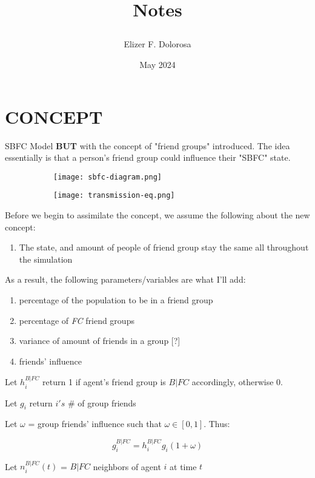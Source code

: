 \documentclass{article}
\title{

  Notes
}
\author{Elizer F. Dolorosa}
\date{May 2024}
\begin{document}
\maketitle

\section{CONCEPT}
SBFC Model \textbf{BUT} with the concept of "friend groups" introduced. The idea essentially is that a person's friend group could influence their "SBFC" state.

\begin{figure}[h]
  \begin{subfigure}{0.57\textwidth}
    \texttt{[image: sbfc-diagram.png]}
  \end{subfigure}
  \begin{subfigure}{0.42\textwidth}
    \texttt{[image: transmission-eq.png]}
  \end{subfigure}
\end{figure}

Before we begin to assimilate the concept, we assume the following about the new concept:
\begin{enumerate}
  \item The state, and amount of people of friend group stay the same all throughout the simulation
\end{enumerate}

As a result, the following parameters/variables are what I'll add:
\begin{enumerate}
  \item percentage of the population to be in a friend group
  \item percentage of \textit{FC} friend groups
  \item variance of amount of friends in a group [?]
  \item friends' influence
\end{enumerate}

Let $h_i^{B|FC}$ return 1 if agent's friend group is $B|FC$ accordingly, otherwise 0.

Let $g_i$ return $i's$ \# of group friends

Let $\omega$ = group friends' influence such that $\omega \in [0,1]$. Thus:

\[g_i^{B|FC} = h_i^{B|FC}g_i(1+\omega)\]

Let $n_i^{B|FC}(t)$ = $B|FC$ neighbors of agent $i$ at time $t$
\end{document}
